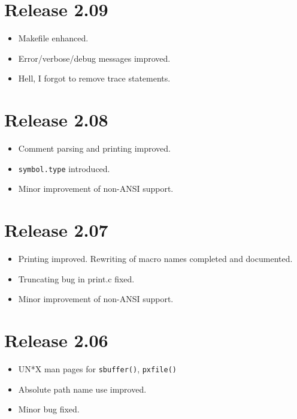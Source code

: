 \documentclass[11pt,a4paper]{scrartcl}
\newcommand\rsc[1]{\texttt{#1}}
\newcommand\File[1]{\textsf{#1}}
\newenvironment{Release}[2]{\section*{Release #1}\begin{itemize}}{\end{itemize}}
\newenvironment{Fix}[1]{\item }{}
\newenvironment{New}[1]{\item }{}
\newenvironment{Update}[1]{\item }{}
\begin{document}
 \begin{Release}{2.09}{}
  \begin{Update}{gene}
    \File{Makefile} enhanced.
  \end{Update}
  \begin{Update}{gene}
    Error/verbose/debug messages improved.
  \end{Update}
  \begin{Fix}{gene}
    Hell, I forgot to remove trace statements.
  \end{Fix}
 \end{Release}

 \begin{Release}{2.08}{}
  \begin{Update}{gene}
    Comment parsing and printing improved.
  \end{Update}
  \begin{New}{gene}
    \rsc{symbol.type} introduced.
  \end{New}
  \begin{Update}{gene}
    Minor improvement of non-ANSI support.
  \end{Update}
 \end{Release}

 \begin{Release}{2.07}{}
  \begin{Update}{gene}
    Printing improved. Rewriting of macro names completed and
    documented.
  \end{Update}
  \begin{Fix}{gene}
    Truncating bug in \File{print.c} fixed.
  \end{Fix}
  \begin{Update}{gene}
    Minor improvement of non-ANSI support.
  \end{Update}
 \end{Release}

 \begin{Release}{2.06}{}
  \begin{New}{gene}
    UN*X man pages for \verb|sbuffer()|, \verb|pxfile()|
  \end{New}
  \begin{Update}{gene}
    Absolute path name use improved.
  \end{Update}
  \begin{Fix}{gene}
    Minor bug fixed.
  \end{Fix}
 \end{Release}
\end{document}
